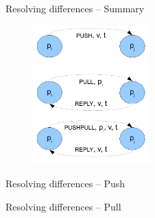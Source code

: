 \begin{frame}{Resolving differences -- Summary}
	
\begin{figure}
	\includegraphics[width=0.4\textwidth]{figs/05/push-pull}
\end{figure}
	
\end{frame}

\begin{frame}{Resolving differences -- Push}

\begin{Procedure}
\caption{Anti-entropy, Push protocol executed by process $p_i$:}
\BlankLine
{}

\end{Procedure}


\end{frame}

\begin{frame}{Resolving differences -- Pull}

\begin{Procedure}
\caption{Anti-entropy, Pull protocol executed by process $p_i$:}
\BlankLine
{}
\end{Procedure}

\end{frame}



